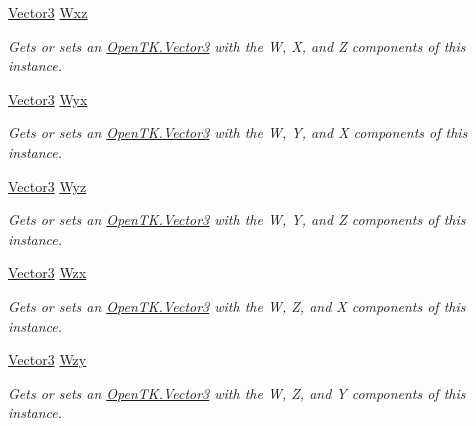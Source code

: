 \begin{DoxyCompactItemize}
\hyperlink{struct_open_t_k_1_1_vector3}{Vector3} \hyperlink{struct_open_t_k_1_1_vector4_a8404d3e04b4c44ce26ba521c4449adf4}{Wxz}
\begin{DoxyCompactList}\small\item\em Gets or sets an \hyperlink{struct_open_t_k_1_1_vector3}{Open\-T\-K.\-Vector3} with the W, X, and Z components of this instance. \end{DoxyCompactList}\item 
\hyperlink{struct_open_t_k_1_1_vector3}{Vector3} \hyperlink{struct_open_t_k_1_1_vector4_ae72bf98597020d5e0c9cb159b6336576}{Wyx}
\begin{DoxyCompactList}\small\item\em Gets or sets an \hyperlink{struct_open_t_k_1_1_vector3}{Open\-T\-K.\-Vector3} with the W, Y, and X components of this instance. \end{DoxyCompactList}\item 
\hyperlink{struct_open_t_k_1_1_vector3}{Vector3} \hyperlink{struct_open_t_k_1_1_vector4_af3823ed1d229208602c5596e991fb717}{Wyz}
\begin{DoxyCompactList}\small\item\em Gets or sets an \hyperlink{struct_open_t_k_1_1_vector3}{Open\-T\-K.\-Vector3} with the W, Y, and Z components of this instance. \end{DoxyCompactList}\item 
\hyperlink{struct_open_t_k_1_1_vector3}{Vector3} \hyperlink{struct_open_t_k_1_1_vector4_a9a8ec929cd4595fd41016473a729f0ef}{Wzx}
\begin{DoxyCompactList}\small\item\em Gets or sets an \hyperlink{struct_open_t_k_1_1_vector3}{Open\-T\-K.\-Vector3} with the W, Z, and X components of this instance. \end{DoxyCompactList}\item 
\hyperlink{struct_open_t_k_1_1_vector3}{Vector3} \hyperlink{struct_open_t_k_1_1_vector4_a21bf7a074dd1f87eda81b1b855e93eff}{Wzy}
\begin{DoxyCompactList}\small\item\em Gets or sets an \hyperlink{struct_open_t_k_1_1_vector3}{Open\-T\-K.\-Vector3} with the W, Z, and Y components of this instance. \end{DoxyCompactList}\item 

\end{DoxyCompactItemize}
